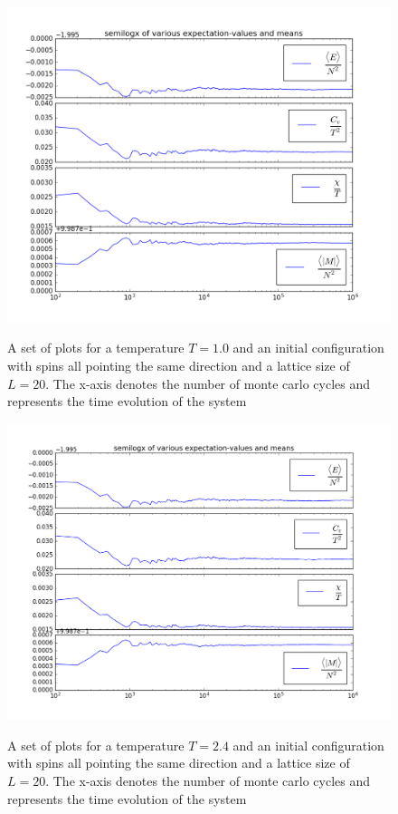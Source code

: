 \documentclass[12pt]{article}
\begin{document}
\begin{figure}[H]
\hspace*{-1cm}\includegraphics[scale=0.6]{exp_vals_ord_1.png}\label{fig:exp_t1_ord}
\caption{A set of plots for a temperature $T = 1.0$ and an initial configuration with spins all pointing the same direction and a lattice size of $L = 20 $. The x-axis denotes the number of monte carlo cycles and represents the time evolution of the system}
\end{figure}

\begin{figure}[H]
\hspace*{-1cm}\includegraphics[scale=0.55]{exp_vals_ord_2.png}\label{fig:exp_t2_ord}
\caption{A set of plots for a temperature $T = 2.4$ and an initial configuration with spins all pointing the same direction and a lattice size of $L = 20 $. The x-axis denotes the number of monte carlo cycles and represents the time evolution of the system}
\end{figure}
\end{document}
